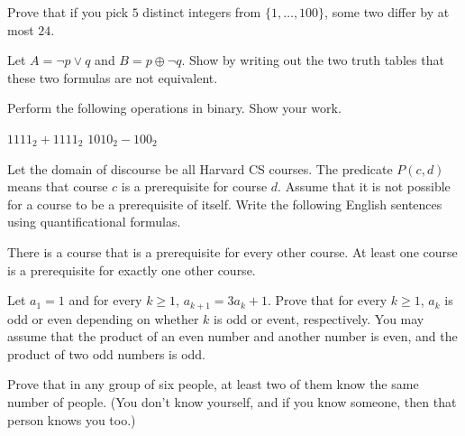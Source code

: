 \documentclass[solution, letterpaper]{cs20exam}
\begin{document}

\problem{}{} Prove that if you pick $5$ distinct integers from $\{1, \ldots, 100\}$, some two differ by at most $24$.

\begin{solution}
\end{solution}

\problem{}{} Let $A = \neg p \lor q$ and $B = p \oplus \neg q$. Show by writing out the two truth tables that these two formulas are not equivalent.

\begin{solution}
\end{solution}

\problem{}{} Perform the following operations in binary. Show your work.

\subproblem $1111_2 + 1111_2$
\subproblem $1010_2 - 100_2$

\begin{solution}
\end{solution}

\problem{}{} Let the domain of discourse be all Harvard CS courses. The predicate $P(c, d)$ means that course $c$ is a prerequisite for course $d$. Assume that it is not possible for a course to be a prerequisite of itself. Write the following English sentences using quantificational formulas.

\subproblem There is a course that is a prerequisite for every other course.
\subproblem At least one course is a prerequisite for exactly one other course.

\begin{solution}
\end{solution}

\problem{}{}
Let $a_1=1$ and for every $k \geq 1$, $a_{k+1}=3a_k+1$. Prove that for every $k \geq1 $, $a_k$ is odd or even depending on whether $k$ is odd or event, respectively. You may assume that the product of an even number and another number is even, and the product of two odd numbers is odd.

\begin{solution}
\end{solution}

\problem{}{}
Prove that in any group of six people, at least two of them know the same number of people. (You don't know yourself, and if you know someone, then that person knows you too.)

\begin{solution}
\end{solution}
\end{document}
